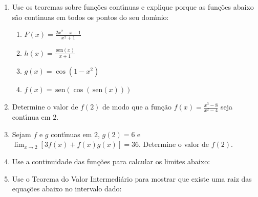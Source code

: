 \documentclass[a4paper,5pt]{amsbook}
\newcommand{\sen}{\,\mbox{sen}}
\newcommand{\ds}{\displaystyle}
\newcommand{\ra}{\rightarrow}
\begin{document}
\begin{enumerate}
    \vspace{0.5cm}
    \item Use os teoremas sobre fun\c{c}\~oes cont\'{\i}nuas e explique porque as
        fun\c{c}\~oes abaixo s\~ao cont\'{\i}nuas em todos os pontos do seu dom\'{\i}nio:
        \begin{enumerate}
            \vspace{0.3cm}
            \item $F(x)=\ds\frac{2x^2-x-1}{x^2+1}$
            \vspace{0.3cm}
            \item $h(x)=\ds\frac{\sen(x)}{x+1}$
            \vspace{0.3cm}
            \item $g(x)=\cos(1-x^2)$
            \vspace{0.3cm}
            \item $f(x)=\sen(\cos(\sen(x)))$
        \end{enumerate}

    \vspace{0.5cm}
    \item Determine o valor de $f(2)$ de modo que a fun\c{c}\~ao
        $f(x)=\ds\frac{x^3-8}{x^2-4}$ seja cont\'{\i}nua em $2$.

    \vspace{0.5cm}
    \item Sejam $f$ e $g$ cont\'{\i}nuas em $2$, $g(2)=6$ e $\ds\lim_{x\ra2}
        \left[3f(x)+f(x)g(x)\right]=36$. Determine o valor de $f(2)$.

    \vspace{0.5cm}
    \item Use a continuidade das fun\c{c}\~oes para calcular os limites abaixo:


    \vspace{0.5cm}
    \item Use o Teorema do Valor Intermedi\'ario para mostrar que existe uma
        raiz das equa\c{c}\~oes abaixo no intervalo dado:

\end{enumerate}
\end{document}
